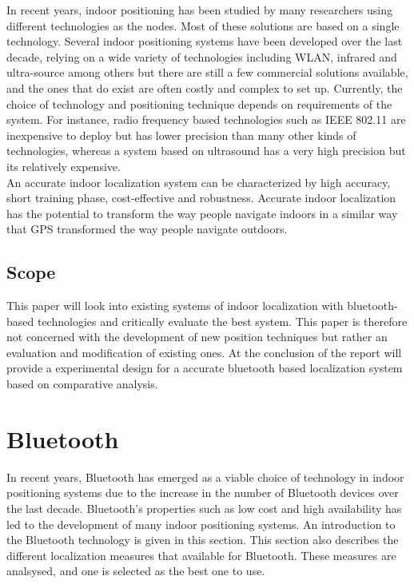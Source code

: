 \documentclass[12pt]{article}
\begin{document}
In recent years, indoor positioning has been studied by many researchers using different technologies as the nodes. Most of these solutions are based on a single technology. Several indoor positioning systems have been developed over the last decade, relying on a wide variety of technologies including WLAN, infrared and ultra-source among others but there are still a few commercial solutions available, and the ones that do exist are often costly and complex to set up. Currently, the choice of technology and positioning technique depends on requirements of the system. For instance, radio frequency based technologies such as IEEE 802.11 are inexpensive to deploy but has lower precision than many other kinds of technologies, whereas a system based on ultrasound has a very high precision but its relatively expensive. \cite{bluetooth-master-thesis}\\

An accurate indoor localization system can be characterized by high accuracy, short training phase, cost-effective and robustness. Accurate indoor localization has the potential to transform the way people navigate indoors in a similar way that GPS transformed the way people navigate outdoors. \\

\subsection{Scope}
This paper will look into existing systems of indoor localization with bluetooth-based technologies and critically evaluate the best system. This paper is therefore not concerned with the development of new position techniques but rather an evaluation and modification of existing ones. At the conclusion of the report will provide a experimental design for a accurate bluetooth based localization system based on comparative analysis. 

\section{Bluetooth}

In recent years, Bluetooth has emerged as a viable choice of technology in indoor positioning systems due to the increase in the number of Bluetooth devices over the last decade. Bluetooth's properties such as low cost and high availability has led to the development of many indoor positioning systems.  An introduction to the Bluetooth technology is given in this section. This section also describes the different localization measures that available for Bluetooth. These measures are analsysed, and one is selected as the best one to use. 
\end{document}
